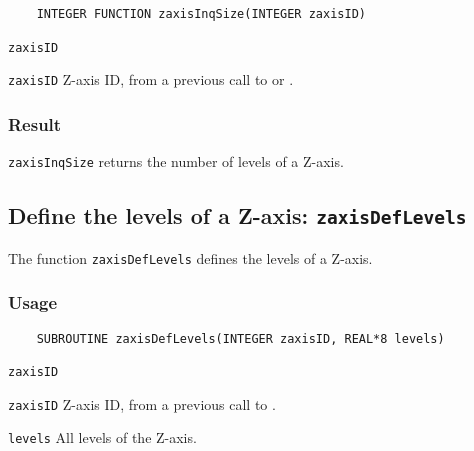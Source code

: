 \begin{verbatim}
    INTEGER FUNCTION zaxisInqSize(INTEGER zaxisID)
\end{verbatim}

\hspace*{4mm}\begin{minipage}[]{15cm}
\begin{deflist}{\texttt{zaxisID}\ }
\item[\texttt{zaxisID}]
Z-axis ID, from a previous call to {} or {}.

\end{deflist}
\end{minipage}

\subsubsection*{Result}

{\texttt{zaxisInqSize}} returns the number of levels of a Z-axis.



\subsection{Define the levels of a Z-axis: \texttt{zaxisDefLevels}}
\label{zaxisDefLevels}

The function {\texttt{zaxisDefLevels}} defines the levels of a Z-axis.

\subsubsection*{Usage}

\begin{verbatim}
    SUBROUTINE zaxisDefLevels(INTEGER zaxisID, REAL*8 levels)
\end{verbatim}

\hspace*{4mm}\begin{minipage}[]{15cm}
\begin{deflist}{\texttt{zaxisID}\ }
\item[\texttt{zaxisID}]
Z-axis ID, from a previous call to {}.
\item[\texttt{levels}]
All levels of the Z-axis.

\end{deflist}
\end{minipage}


